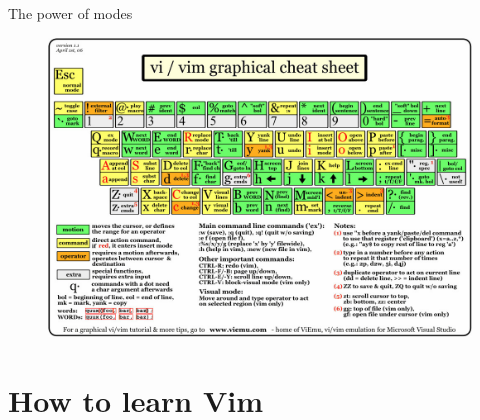 \documentclass{beamer}
\begin{document}
    \begin{frame}{The power of modes}
        \begin{figure}
            \centering
            \includegraphics[width=0.8\linewidth]{vi-vim-cheat-sheet.jpg}
        \end{figure}
    \end{frame}
    \section{How to learn Vim}
\end{document}
